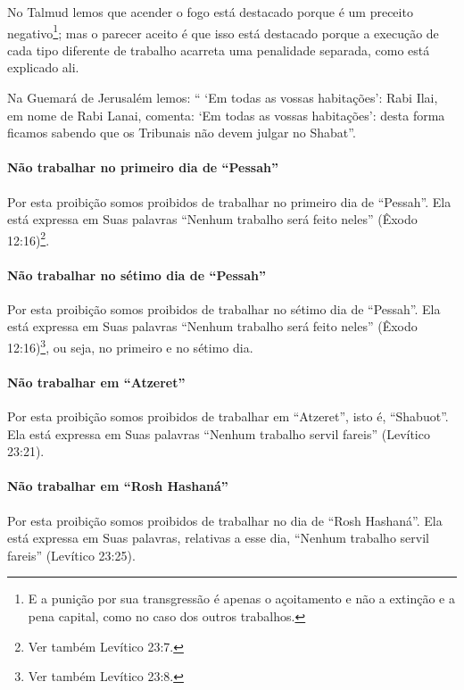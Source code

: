 No Talmud lemos que acender o fogo está destacado porque é um preceito
negativo\footnote{E a punição por sua transgressão é apenas o açoitamento e não a
  extinção e a pena capital, como no caso dos outros trabalhos.}; mas o parecer aceito é que isso está
destacado porque a execução de cada tipo diferente de trabalho acarreta
uma penalidade separada, como está explicado ali.

Na Guemará de Jerusalém lemos: `` `Em todas as vossas habitações': Rabi
Ilai, em nome de Rabi Lanai, comenta: `Em todas as vossas habitações':
desta forma ficamos sabendo que os Tribunais não devem julgar no
Shabat''.

\paragraph{Não trabalhar no primeiro dia de ``Pessah''}

Por esta proibição somos proibidos de trabalhar no primeiro dia de
``Pessah''. Ela está expressa em Suas palavras ``Nenhum trabalho será
feito neles'' (Êxodo 12:16)\footnote{Ver também Levítico 23:7.}.

\paragraph{Não trabalhar no sétimo dia de ``Pessah''}

Por esta proibição somos proibidos de trabalhar no sétimo dia de
``Pessah''. Ela está expressa em Suas palavras ``Nenhum trabalho será
feito neles'' (Êxodo 12:16)\footnote{Ver também Levítico 23:8.}, ou seja, no primeiro
e no sétimo dia.

\paragraph{Não trabalhar em ``Atzeret''}

Por esta proibição somos proibidos de trabalhar em ``Atzeret'', isto é,
``Shabuot''. Ela está expressa em Suas palavras ``Nenhum trabalho servil
fareis'' (Levítico 23:21).

\paragraph{Não trabalhar em ``Rosh Hashaná''}

Por esta proibição somos proibidos de trabalhar no dia de ``Rosh
Hashaná''. Ela está expressa em Suas palavras, relativas a esse dia,
``Nenhum trabalho servil fareis'' (Levítico 23:25).

